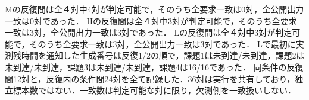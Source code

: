 Mの反復間は全４対中4対が判定可能で，そのうち全要求一致は0対，全公開出力一致は0対であった．
Hの反復間は全４対中3対が判定可能で，そのうち全要求一致は3対，全公開出力一致は3対であった．
Lの反復間は全４対中3対が判定可能で，そのうち全要求一致は3対，全公開出力一致は3対であった．
Lで最初に実測残時間を通知した生成番号は反復1/2の順で，課題1は未到達/未到達，課題2は未到達/未到達，課題3は未到達/未到達，課題4は16/16であった．
同条件の反復間12対と，反復内の条件間24対を全て記録した．36対は実行を共有しており，独立標本数ではない．一致数は判定可能な対に限り，欠測側を一致扱いしない．
